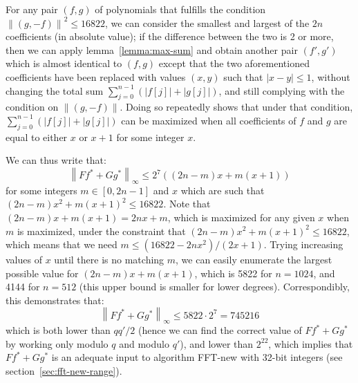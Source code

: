 \documentclass{llncs}
\newcommand{\norm}[1]{\left\|#1\right\|}
\newcommand{\norminf}[1]{\norm{#1}_{\infty}}
\newcommand{\adj}[1]{{#1}^*}
\begin{document}
For any pair $(f,g)$ of polynomials that fulfills the condition
$\norm{(g,-f)}^2 \leq 16822$, we can consider the smallest and largest of
the $2n$ coefficients (in absolute value); if the difference between the
two is 2 or more, then we can apply lemma~\ref{lemma:max-sum} and obtain
another pair $(f',g')$ which is almost identical to $(f,g)$ except that
the two aforementioned coefficients have been replaced with values $(x,
y)$ such that $|x - y|\leq 1$, without changing the total sum
$\sum_{j=0}^{n-1} (|f[j]| + |g[j]|)$, and still complying with the
condition on $\norm{(g,-f)}$. Doing so repeatedly shows that under that
condition, $\sum_{j=0}^{n-1} (|f[j]| + |g[j]|)$ can be maximized when all
coefficients of $f$ and $g$ are equal to either $x$ or $x+1$ for some
integer $x$.

We can thus write that:
\begin{equation*}
    \norminf{F\adj{f} + G\adj{g}} \leq 2^7 ((2n - m) x + m (x + 1))
\end{equation*}
for some integers $m\in [0, 2n-1]$ and $x$ which are such that $(2n - m)
x^2 + m (x + 1)^2 \leq 16822$. Note that $(2n - m) x + m(x + 1) = 2nx +
m$, which is maximized for any given $x$ when $m$ is maximized, under
the constraint that $(2n - m) x^2 + m (x + 1)^2 \leq 16822$, which means
that we need $m \leq (16822 - 2nx^2)/(2x + 1)$. Trying increasing values
of $x$ until there is no matching $m$, we can easily enumerate the
largest possible value for $(2n - m) x + m (x + 1)$, which is 5822 for
$n = 1024$, and 4144 for $n = 512$ (this upper bound is smaller for lower
degrees). Correspondibly, this demonstrates that:
\begin{equation*}
    \norminf{F\adj{f} + G\adj{g}} \leq 5822\cdot 2^7 = 745216
\end{equation*}
which is both lower than $qq'/2$ (hence we can find the correct value
of $F\adj{f} + G\adj{g}$ by working only modulo $q$ and modulo $q'$),
and lower than $2^{22}$, which implies that $F\adj{f} + G\adj{g}$ is
an adequate input to algorithm \textsf{FFT-new} with 32-bit integers
(see section~\ref{sec:fft-new-range}).
\end{document}

